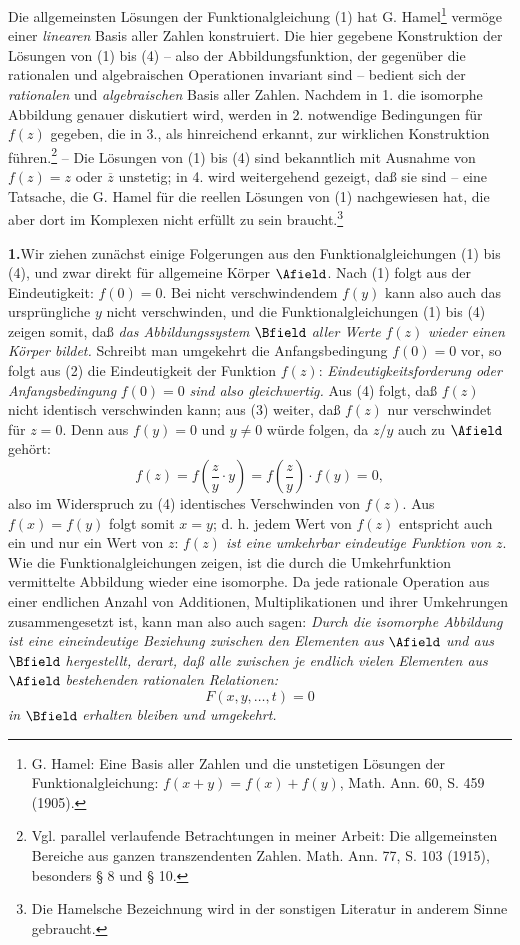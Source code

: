 Die allgemeinsten Lösungen der Funktionalgleichung (1) hat G. Hamel\footnote{G. Hamel: Eine Basis aller Zahlen und die unstetigen Lösungen der Funktionalgleichung: \(f(x+y)=f(x)+f(y)\), Math. Ann. 60, S. 459 (1905).} vermöge einer \emph{linearen} Basis aller Zahlen konstruiert. Die hier gegebene Konstruktion der Lösungen von (1) bis (4) -- also der Abbildungsfunktion, der gegenüber die rationalen und algebraischen Operationen invariant sind -- bedient sich der \emph{rationalen} und \emph{algebraischen} Basis aller Zahlen. Nachdem in 1. die isomorphe Abbildung genauer diskutiert wird, werden in 2. notwendige Bedingungen für \(f(z)\) gegeben, die in 3., als hinreichend erkannt, zur wirklichen Konstruktion führen.\footnote{Vgl. parallel verlaufende Betrachtungen in meiner Arbeit: Die allgemeinsten Bereiche aus ganzen transzendenten Zahlen. Math. Ann. 77, S. 103 (1915), besonders § 8 und § 10.} -- Die Lösungen von (1) bis (4) sind bekanntlich mit Ausnahme von \(f(z)=z\) oder \(\overline z\) unstetig; in 4. wird weitergehend gezeigt, daß sie  sind -- eine Tatsache, die G. Hamel für die reellen Lösungen von (1) nachgewiesen hat, die aber dort im Komplexen nicht erfüllt zu sein braucht.\footnote{Die Hamelsche Bezeichnung  wird in der sonstigen Literatur in anderem Sinne gebraucht.}

\medskip
\noindent\textbf{1.}\quad Wir ziehen zunächst einige Folgerungen aus den Funktionalgleichungen (1) bis (4), und zwar direkt für allgemeine Körper \(\Afield\). Nach (1) folgt aus der Eindeutigkeit: \(f(0)=0\). Bei nicht verschwindendem \(f(y)\) kann also auch das ursprüngliche \(y\) nicht verschwinden, und die Funktionalgleichungen (1) bis (4) zeigen somit, daß \emph{das Abbildungssystem} \(\Bfield\) \emph{aller Werte} \(f(z)\) \emph{wieder einen Körper bildet.} Schreibt man umgekehrt die Anfangsbedingung \(f(0)=0\) vor, so folgt aus (2) die Eindeutigkeit der Funktion \(f(z)\): \emph{Eindeutigkeitsforderung oder Anfangsbedingung} \(f(0)=0\) \emph{sind also gleichwertig.} Aus (4) folgt, daß \(f(z)\) nicht identisch verschwinden kann; aus (3) weiter, daß \(f(z)\) nur verschwindet für \(z=0\). Denn aus \(f(y)=0\) und \(y\ne0\) würde folgen, da \(z/y\) auch zu \(\Afield\) gehört:
\[
f(z)=f\!\left(\frac{z}{y}\cdot y\right)=f\!\left(\frac{z}{y}\right)\cdot f(y)=0,
\]
also im Widerspruch zu (4) identisches Verschwinden von \(f(z)\). Aus \(f(x)=f(y)\) folgt somit \(x=y\); d. h. jedem Wert von \(f(z)\) entspricht auch ein und nur ein Wert von \(z\): \emph{\(f(z)\) ist eine umkehrbar eindeutige Funktion von} \(z\). Wie die Funktionalgleichungen zeigen, ist die durch die Umkehrfunktion vermittelte Abbildung wieder eine isomorphe. Da jede rationale Operation aus einer endlichen Anzahl von Additionen, Multiplikationen und ihrer Umkehrungen zusammengesetzt ist, kann man also auch sagen: \emph{Durch die isomorphe Abbildung ist eine eineindeutige Beziehung zwischen den Elementen aus} \(\Afield\) \emph{und aus} \(\Bfield\) \emph{hergestellt, derart, daß alle zwischen je endlich vielen Elementen aus} \(\Afield\) \emph{bestehenden rationalen Relationen:}
\[
F(x,y,\ldots,t)=0
\]
\emph{in} \(\Bfield\) \emph{erhalten bleiben und umgekehrt.}

